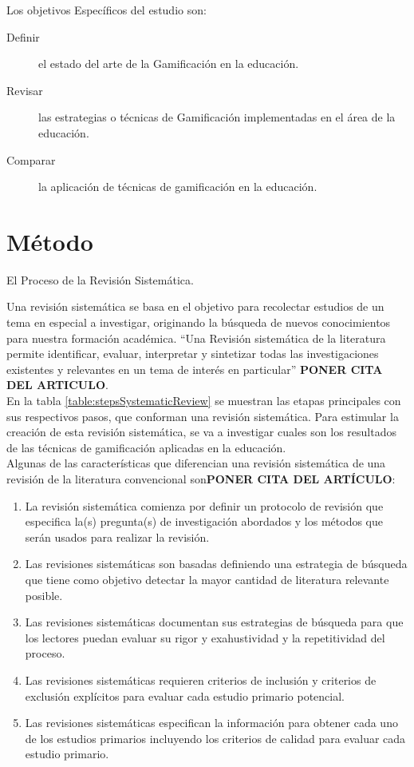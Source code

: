 \documentclass{report}
\begin{document}
	Los objetivos Específicos del estudio son:
	\begin{description}
		\item[Definir] el estado del arte de la Gamificación en la educación.
		\item[Revisar] las estrategias o técnicas de Gamificación implementadas en el área de la educación.
		\item[Comparar] la aplicación de técnicas de gamificación en la educación.    	
	\end{description}
	
	\section{Método}
	    El Proceso de la Revisión Sistemática.
	    
	    Una revisión sistemática se basa en el objetivo para recolectar estudios de un tema en especial a investigar, originando la búsqueda de nuevos conocimientos para nuestra formación académica. ``Una Revisión sistemática de la literatura permite identificar, evaluar, interpretar y sintetizar todas las investigaciones existentes y relevantes en un tema de interés en particular'' \textbf{PONER CITA DEL ARTICULO}.\\
	    En la tabla \ref{table:stepsSystematicReview} se muestran las etapas principales con sus respectivos pasos, que conforman una revisión sistemática. Para estimular la creación de esta revisión sistemática, se va a investigar cuales son los resultados de las técnicas de gamificación aplicadas en la educación.\\
	    Algunas de las características que diferencian una revisión sistemática de una revisión de la literatura convencional son\textbf{PONER CITA DEL ARTÍCULO}:
	    \begin{enumerate}    
	    	\item La revisión sistemática comienza por definir un protocolo de revisión que especifica la(s) pregunta(s) de investigación abordados y los métodos que serán usados para realizar la revisión.
	    	\item Las revisiones sistemáticas son basadas definiendo una estrategia de búsqueda que tiene como objetivo detectar la mayor cantidad de literatura relevante posible.
	    	\item Las revisiones sistemáticas documentan sus estrategias de búsqueda para que los lectores puedan evaluar su rigor y exahustividad y la repetitividad del proceso.
	    	\item Las revisiones sistemáticas requieren criterios de inclusión y criterios de exclusión explícitos para evaluar cada estudio primario potencial.
	    	\item Las revisiones sistemáticas especifican la información para obtener cada uno de los estudios primarios incluyendo los criterios de calidad para evaluar cada estudio primario.
	    \end{enumerate}
\end{document}
